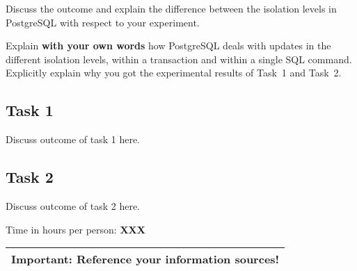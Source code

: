 \documentclass[11pt]{scrartcl}
\begin{document}
Discuss the outcome and explain the difference between the isolation
levels in PostgreSQL with respect to your experiment.

Explain {\bf with your own words} how PostgreSQL deals with updates in
the different isolation levels, within a transaction and within a
single SQL command. Explicitly explain why you got the experimental
results of Task~1 and Task~2.

\subsection*{Task 1}

Discuss outcome of task 1 here.

\subsection*{Task 2}

Discuss outcome of task 2 here.

\bigskip

\noindent Time in hours per person: {\bf XXX}

\bigskip

\begin{center}
  \begin{tabular}{c}
    \hline
    {\bf Important:} Reference your information sources!
    \\\hline
  \end{tabular}
\end{center}
\end{document}
